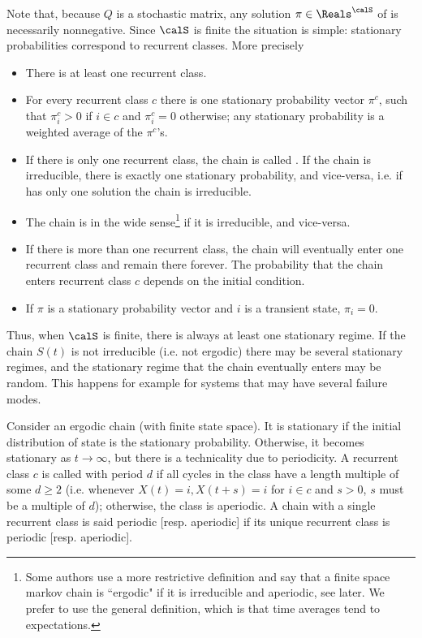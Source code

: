 Note that, because $Q$ is a stochastic matrix, any solution
$\pi\in \Reals^{\calS}$ of  is necessarily
nonnegative.
 Since $\calS$ is finite the
situation is simple: stationary probabilities correspond to
recurrent classes. More precisely \noitemsep
 \begin{itemize}
   \item There is at least one recurrent class.
   \item For every recurrent class $c$ there is one
       stationary probability vector $\pi^c$, such that
       $\pi_i^c > 0 $ if $i \in c$ and $\pi_i^c= 0 $
       otherwise; any stationary probability is a weighted
       average of the $\pi^c$'s.
   \item If there is only one recurrent class, the chain is
       called . If the chain is
       irreducible, there is exactly one stationary
       probability, and vice-versa, i.e.  if
        has only one solution  the
       chain is irreducible.
       \item The chain is  in the wide
           sense\footnote{Some authors use a more
           restrictive definition and say that a finite
           space markov chain is ``ergodic" if it is
           irreducible and aperiodic, see later. We prefer
           to use the general definition, which is that
           time averages tend to expectations.} if it is
           irreducible, and vice-versa.
       \item If there is more than one recurrent class, the
           chain will eventually enter one recurrent class
           and remain there forever. The probability that
           the chain enters recurrent class $c$ depends on
           the initial condition.
           \item
If $\pi$ is a stationary probability vector and $i$ is a
transient state, $\pi_i=0$.
 \end{itemize}

Thus, when $\calS$ is finite, there is always at least one
stationary regime. If the  chain $S(t)$ is not irreducible
(i.e. not ergodic) there may be several stationary regimes, and
the stationary regime that the chain eventually enters may be
random. This happens for example for systems that may have
several failure modes.

Consider an ergodic chain (with finite state space). It is
stationary if the initial distribution of state is the
stationary probability. Otherwise, it becomes stationary as $t
\to {\infty}$, but there is a technicality due to periodicity.
A recurrent class $c$ is called  with period $d$
if all cycles in the class have a length multiple of some
$d\geq 2$ (i.e. whenever $X(t)=i, X(t+s)=i$ for $i \in c$ and
$s >0$, $s$ must be a multiple of $d$); otherwise, the class is
aperiodic. A chain with a single recurrent class is said
periodic [resp. aperiodic] if its unique recurrent class is
periodic [resp. aperiodic].

